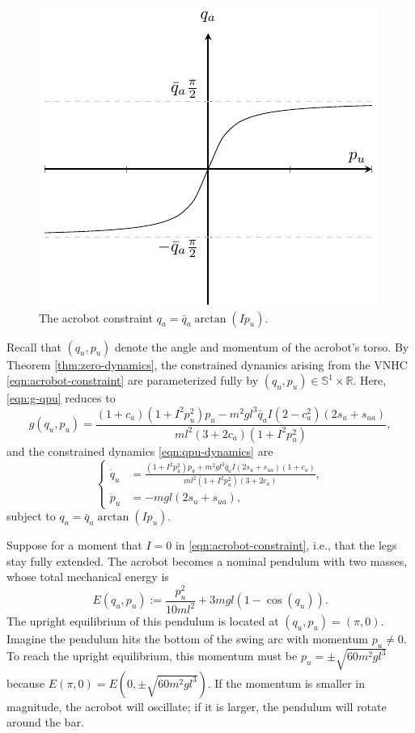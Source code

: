 \documentclass[journal,twoside,web, onecolumn, draftcls]{ieeecolor}
\newcommand*{\R}{\mathbb{R}}
\newcommand*{\Sone}{\mathbb{S}^1}
\newcommand*{\SxR}{\Sone \times \R}
\begin{document}
\begin{figure}
    \centering
    \includegraphics[width=0.7\linewidth]{qa_arctan.pdf}
    \caption{The acrobot constraint \(q_a = \bar{q}_a \arctan(I p_u)\).}
    \label{fig:qa-arctan}
\end{figure}

Recall that \((q_u, p_u)\) denote the angle and momentum of the acrobot's torso.
By Theorem \ref{thm:zero-dynamics}, the constrained dynamics arising from the
VNHC \eqref{eqn:acrobot-constraint} are parameterized fully by 
\((q_u,p_u) \in \SxR\).
Here, \eqref{eqn:g-qpu} reduces to
\begin{equation*}
    g(q_u,p_u) = \frac{
        (1+c_a)(1+I^2 p_u^2)p_u - m^2gl^3\bar{q}_a I (2-c_a^2)(2s_u + s_{ua})
    }{ml^2(3+2c_a)(1+I^2 p_u^2)}
    ,
\end{equation*}
and the constrained dynamics \eqref{eqn:qpu-dynamics} are
\begin{equation}\label{eqn:acrobot-constrained-dynamics}
    \begin{cases}
    \dot{q}_u &= \frac{(1+I^2 p_u^2)p_u + m^2gl^3\bar{q}_a I(2s_u + s_{ua})(1+c_a) }
            {ml^2(1+I^2 p_u^2)(3+2c_a)}
    ,    \\
    \dot{p}_u &= - m g l (2s_u + s_{ua})
    ,
    \end{cases}
\end{equation}
subject to \(q_a = \bar{q}_a \arctan(I p_u)\).

Suppose for a moment that \(I = 0\) in \eqref{eqn:acrobot-constraint}, i.e.,
that the legs stay fully extended.
The acrobot becomes a nominal pendulum with two masses, whose total mechanical
energy is
\begin{equation}\label{eqn:nominal-energy}
    E(q_u,p_u) := \frac{p_u^2}{10ml^2} + 3mgl(1 - \cos(q_u))
    .
\end{equation}
The upright equilibrium of this pendulum is located at \((q_u,p_u) = (\pi,0)\).
Imagine the pendulum hits the bottom of the swing arc with momentum 
\(p_u \neq 0\). 
To reach the upright equilibrium, this momentum must be
\(p_u = \pm\sqrt{60m^2gl^3}\) because \(E(\pi,0) = E(0,\pm\sqrt{60m^2gl^3})\).
If the momentum is smaller in magnitude, the acrobot will oscillate; 
if it is larger, the pendulum will rotate around the bar.
\end{document}
